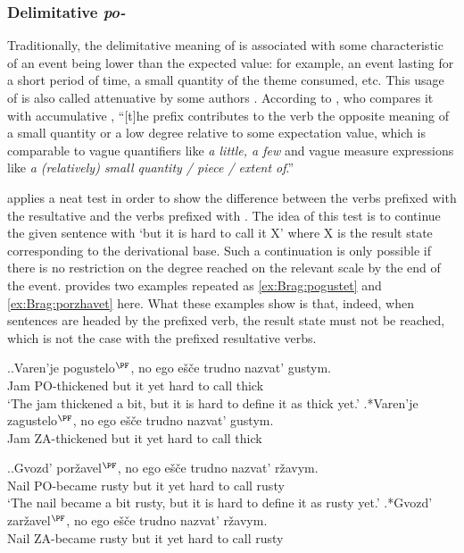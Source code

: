 \subsubsection{Delimitative \textit{po-}}
Traditionally, the delimitative meaning of  is associated with some characteristic of an event being lower than the expected value: for example, an event lasting for a short period of time, a small quantity of the theme consumed, etc. This usage of  is also called attenuative by some authors \citep[e.g.][]{Svenonius:04b}. According to \citet[47--48]{Filip:00}, who compares it with accumulative , ``[t]he prefix  contributes to the verb the opposite meaning of a small quantity or a low degree relative to some expectation value, which is comparable to vague quantifiers like \textit{a little, a few} and vague measure expressions like \textit{a (relatively) small quantity / piece / extent of}.''

\citet[183]{Braginsky:08} applies a neat test in order to show the difference between the verbs prefixed with the resultative  and the verbs prefixed with . The idea of this test is to continue the given sentence with `but it is hard to call it X' where X is the result state corresponding to the derivational base. Such a continuation is only possible if there is no restriction on the degree reached on the relevant scale by the end of the event. \citet[183]{Braginsky:08} provides two examples repeated as \ref{ex:Brag:pogustet} and \ref{ex:Brag:porzhavet} here. What these examples show is that, indeed, when sentences are headed by the prefixed verb, the result state must not be reached, which is not the case with the prefixed resultative verbs.

\ex.\label{ex:Brag:pogustet}\ag.Varen'je pogustelo$^{\PF}$, no ego e\v{s}\v{c}e trudno nazvat' gustym.\\
Jam PO-thickened but it yet hard {to call} thick\\
\trans `The jam thickened a bit, but it is hard to define it as thick yet.'
\bg.*Varen'je zagustelo$^{\PF}$, no ego e\v{s}\v{c}e trudno nazvat' gustym.\\
Jam ZA-thickened but it yet hard {to call} thick\\

\ex.\label{ex:Brag:porzhavet}\ag.Gvozd' por\v{z}avel$^{\PF}$, no ego e\v{s}\v{c}e trudno nazvat' r\v{z}avym.\\
Nail {PO-became rusty} but it yet hard {to call} rusty\\
\trans `The nail became a bit rusty, but it is hard to define it as rusty yet.'
\bg.*Gvozd' zar\v{z}avel$^{\PF}$, no ego e\v{s}\v{c}e trudno nazvat' r\v{z}avym.\\
Nail {ZA-became rusty} but it yet hard {to call} rusty\\

